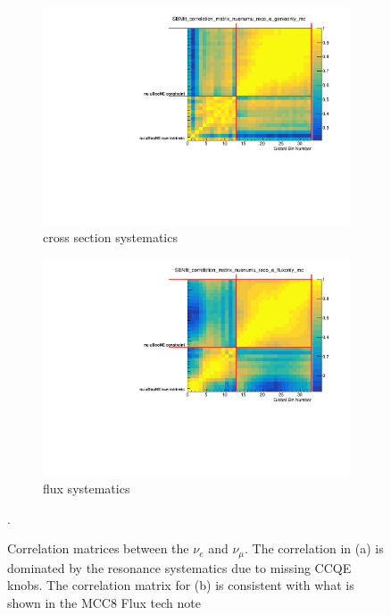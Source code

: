 \documentclass[a4paper]{article}
\begin{document}
\begin{figure}[ht] 
\begin{center}
    \begin{subfigure}[b]{0.45\textwidth}
    \centering
    \includegraphics[width=1.00\textwidth]{Sensitivity/numuconstraint/SBNfit_correlation_matrix_nuenumu_reco_e_genieonly_mc_collapsed.pdf}
    \caption{cross section systematics}
    \end{subfigure}
    \begin{subfigure}[b]{0.45\textwidth}
    \centering
    \includegraphics[width=1.00\textwidth]{Sensitivity/numuconstraint/SBNfit_correlation_matrix_nuenumu_reco_e_fluxonly_mc_collapsed.pdf}
    \caption{flux systematics}
    \end{subfigure}
\caption{\label{fig:numuconstraint} Correlation matrices between the $\nu_e$ and $\nu_\mu$. The correlation in (a) is dominated by the resonance systematics due to missing CCQE knobs. The correlation matrix for (b) is consistent with what is shown in the MCC8 Flux tech note ~\cite{bib:fluxtechnote}}.
\end{center}
\end{figure}
\end{document}
